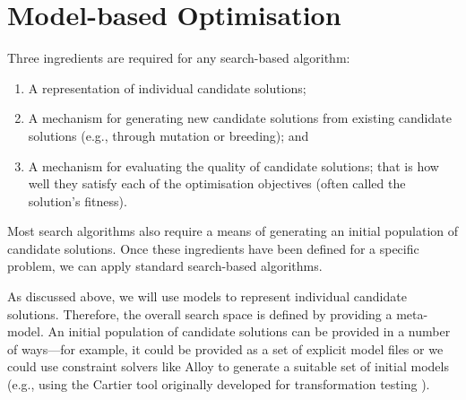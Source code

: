 \section{Model-based Optimisation}
\label{section:mde_optimisation}


	Three ingredients are required for any search-based algorithm: 
	\begin{enumerate}
		\item A representation of individual candidate solutions;
		\item A mechanism for generating new candidate solutions from existing candidate solutions (e.g., through mutation or breeding); and
		\item A mechanism for evaluating the quality of candidate solutions; that is how well they satisfy each of the optimisation objectives (often called the solution's fitness).
	\end{enumerate}
	Most search algorithms also require a means of generating an initial population of candidate solutions. Once these ingredients have been defined for a specific problem, we can apply standard 
	search-based algorithms.
	
	As discussed above, we will use models to represent individual candidate solutions. Therefore, the overall search space is defined by providing a meta-model. An
	initial population of candidate solutions can be provided in a number of ways---for example, it could be provided as a set of explicit model files or we could
	use constraint solvers like Alloy \cite{Jackson02} to generate a suitable set of initial models (e.g., using the Cartier tool originally developed for
	transformation testing \cite{Sen+08,Sen+09}).
	
